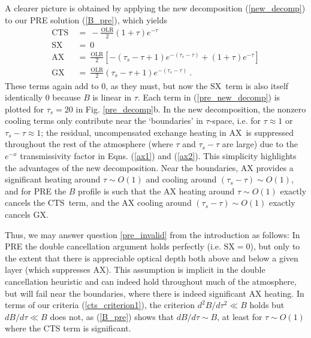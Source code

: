 \documentclass{ametsoc}
\newcommand{\beqn}{\begin{equation}}
\newcommand{\eeqn}{\end{equation}}
\newcommand{\eqnref}[1]{(\ref{#1})}
\newcommand{\OLR}{\ensuremath{\mathrm{OLR}}}
\newcommand{\taus}{\ensuremath{\tau_s}}
\newcommand{\SX}{\ensuremath{\mathrm{SX}}}
\newcommand{\AX}{\ensuremath{\mathrm{AX}}}
\newcommand{\GX}{\ensuremath{\mathrm{GX}}}
\newcommand{\CTS}{\ensuremath{\mathrm{CTS}}}
\begin{document}
A clearer picture is obtained by applying the new decomposition \eqnref{new_decomp} to our PRE solution \eqnref{B_pre},  which yields
\beqn
	\begin{split}
		\CTS &\ =\  -\frac{\OLR}{2}(1+\tau)e^{-\tau} \\
		\SX   &\ =\  0 \\
		\AX   &\ =\  \frac{\OLR}{2}\left[-(\taus-\tau+1)e^{-(\taus-\tau)} + (1+\tau) e^{-\tau} \right] \\
		\GX   &\ =\  \frac{\OLR}{2}(\taus-\tau+1)e^{-(\taus-\tau)}  \ .
	\end{split}
	\label{pre_new_decomp}
\eeqn
These terms again add to 0, as they must, but now  the \SX\ term is also itself identically 0 because $B$ is linear in $\tau$.  Each term in \eqnref{pre_new_decomp} is plotted for $\taus=20$ in Fig. \ref{pre_decomp}b. In the new decomposition, the nonzero cooling terms only contribute near the `boundaries' in $\tau$-space, i.e. for $\tau\approx 1$ or $\taus-\tau \approx 1$;  the residual, uncompensated exchange heating in \AX\ is suppressed  throughout the rest of the atmosphere (where $\tau$ and $\taus-\tau$ are large) due to the $e^{-x}$ transmissivity factor in Eqns. \eqnref{ax1} and \eqnref{ax2}. This simplicity highlights the advantages of the new decomposition. Near the boundaries,  AX provides a significant heating around $\tau\sim O(1)$  and  cooling around $(\taus-\tau)\sim O(1)$, and for PRE the $B$ profile is such that the AX heating around $\tau\sim O(1)$ exactly cancels the \CTS\ term, and the AX cooling around $(\taus-\tau)\sim O(1)$ exactly cancels \GX. 

Thus, we may answer question \ref{pre_invalid} from the introduction as follows: In PRE the double cancellation argument holds perfectly (i.e. $\SX=0$), but only to the extent that there is appreciable optical depth both above and below a given layer (which suppresses \AX). This assumption is implicit in the double cancellation heuristic and can indeed hold throughout much of the atmosphere, but will fail near the boundaries, where there is indeed significant AX heating.  In terms of our criteria \eqnref{cts_criterion1}, the criterion $d^2 B/d \tau^2 \ll B$  holds but  $d B/d \tau \ll B$  does not, as \eqnref{B_pre} shows that $dB/d\tau \sim B$, at least for $\tau \sim O(1)$ where the CTS term is significant.

\end{document}
